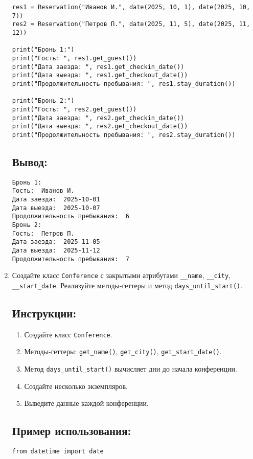\begin{enumerate}
\begin{lstlisting}[caption=Пример кода]
res1 = Reservation("Иванов И.", date(2025, 10, 1), date(2025, 10, 7))
res2 = Reservation("Петров П.", date(2025, 11, 5), date(2025, 11, 12))

print("Бронь 1:")
print("Гость: ", res1.get_guest())
print("Дата заезда: ", res1.get_checkin_date())
print("Дата выезда: ", res1.get_checkout_date())
print("Продолжительность пребывания: ", res1.stay_duration())

print("Бронь 2:")
print("Гость: ", res2.get_guest())
print("Дата заезда: ", res2.get_checkin_date())
print("Дата выезда: ", res2.get_checkout_date())
print("Продолжительность пребывания: ", res2.stay_duration())
\end{lstlisting}

\subsection*{Вывод:}
\begin{lstlisting}[caption=Ожидаемый вывод]
Бронь 1:
Гость:  Иванов И.
Дата заезда:  2025-10-01
Дата выезда:  2025-10-07
Продолжительность пребывания:  6
Бронь 2:
Гость:  Петров П.
Дата заезда:  2025-11-05
Дата выезда:  2025-11-12
Продолжительность пребывания:  7
\end{lstlisting}

\item
Создайте класс \texttt{Conference} с закрытыми атрибутами \texttt{\_\_name}, \texttt{\_\_city}, \texttt{\_\_start\_date}. Реализуйте методы-геттеры и метод \texttt{days\_until\_start()}.

\subsection*{Инструкции:}
\begin{enumerate}
    \item Создайте класс \texttt{Conference}.
    \item Методы-геттеры: \texttt{get\_name()}, \texttt{get\_city()}, \texttt{get\_start\_date()}.
    \item Метод \texttt{days\_until\_start()} вычисляет дни до начала конференции.
    \item Создайте несколько экземпляров.
    \item Выведите данные каждой конференции.
\end{enumerate}

\subsection*{Пример использования:}
\begin{lstlisting}[caption=Пример кода]
from datetime import date


\end{lstlisting}
\end{enumerate}
